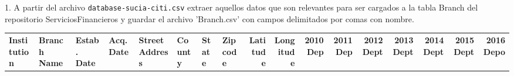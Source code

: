 1. A partir del archivo \texttt{database-sucia-citi.csv} extraer 
aquellos datos que son relevantes para ser cargados a la tabla 
Branch del repositorio ServiciosFinancieros y guardar el archivo 
'Branch.csv' con campos delimitados por comas con nombre.

\vspace{0.5 cm}

\begin{table}[H]
    \centering
    \resizebox{\textwidth}{!}
    {
        \begin{tabular}{llllllllrrrrrrrrr}
            \toprule
            
            \rowcolor{headerblue}
            {
                \color{headertext}\textbf{Institution}
            } &
            {
                \color{headertext}\textbf{Branch Name}
            } &
            {
                \color{headertext}\textbf{Estab. Date}
            } &
            {
                \color{headertext}\textbf{Acq. Date}
            } &
            {
                \color{headertext}\textbf{Street Address}
            } &
            {
                \color{headertext}\textbf{County}
            } &
            {
                \color{headertext}\textbf{State}
            } &
            {
                \color{headertext}\textbf{Zipcode}
            } &
            {
                \color{headertext}\textbf{Latitude}
            } &
            {
                \color{headertext}\textbf{Longitude}
            } &
            {
                \color{headertext}\textbf{2010 Dep}
            } &
            {
                \color{headertext}\textbf{2011 Dep}
            } &
            {
                \color{headertext}\textbf{2012 Dept}
            } &
            {
                \color{headertext}\textbf{2013 Dept}
            } &
            {
                \color{headertext}\textbf{2014 Dept}
            } &
            {
                \color{headertext}\textbf{2015 Dept}
            } &
            {
                \color{headertext}\textbf{2016 Depo}
            } \\
            

\end{tabular}}
\end{table}
